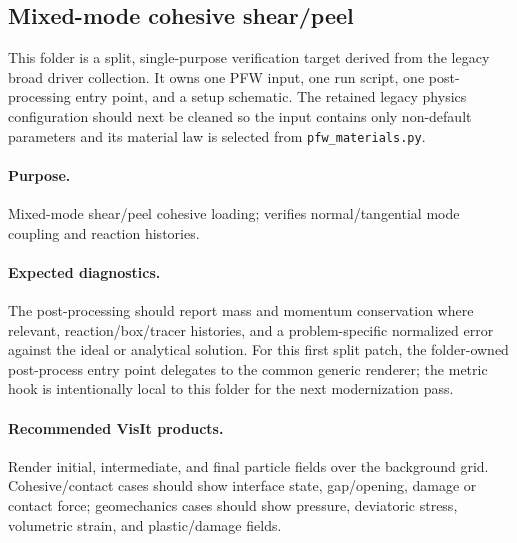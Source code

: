 \subsection{Mixed-mode cohesive shear/peel}
\label{sec:cohesiveZoneShearPeel}

This folder is a split, single-purpose verification target derived from the
legacy broad driver collection.  It owns one PFW input, one run script, one
post-processing entry point, and a setup schematic.  The retained legacy physics
configuration should next be cleaned so the input contains only non-default
parameters and its material law is selected from \texttt{pfw\_materials.py}.

\paragraph{Purpose.} Mixed-mode shear/peel cohesive loading; verifies normal/tangential mode coupling and reaction histories.

\paragraph{Expected diagnostics.} The post-processing should report mass and
momentum conservation where relevant, reaction/box/tracer histories, and a
problem-specific normalized error against the ideal or analytical solution.  For
this first split patch, the folder-owned post-process entry point delegates to
the common generic renderer; the metric hook is intentionally local to this
folder for the next modernization pass.

\paragraph{Recommended VisIt products.} Render initial, intermediate, and final
particle fields over the background grid.  Cohesive/contact cases should show
interface state, gap/opening, damage or contact force; geomechanics cases should
show pressure, deviatoric stress, volumetric strain, and plastic/damage fields.
